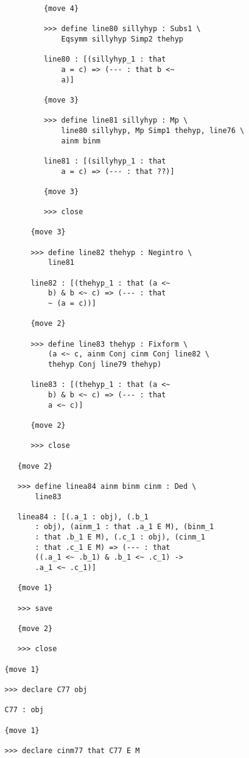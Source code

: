 \documentclass[12pt]{article}
\begin{document}
\begin{verbatim}
            {move 4}

            >>> define line80 sillyhyp : Subs1 \
                Eqsymm sillyhyp Simp2 thehyp

            line80 : [(sillyhyp_1 : that 
                a = c) => (--- : that b <~ 
                a)]

            {move 3}

            >>> define line81 sillyhyp : Mp \
                line80 sillyhyp, Mp Simp1 thehyp, line76 \
                ainm binm

            line81 : [(sillyhyp_1 : that 
                a = c) => (--- : that ??)]

            {move 3}

            >>> close

         {move 3}

         >>> define line82 thehyp : Negintro \
             line81

         line82 : [(thehyp_1 : that (a <~ 
             b) & b <~ c) => (--- : that 
             ~ (a = c))]

         {move 2}

         >>> define line83 thehyp : Fixform \
             (a <~ c, ainm Conj cinm Conj line82 \
             thehyp Conj line79 thehyp)

         line83 : [(thehyp_1 : that (a <~ 
             b) & b <~ c) => (--- : that 
             a <~ c)]

         {move 2}

         >>> close

      {move 2}

      >>> define linea84 ainm binm cinm : Ded \
          line83

      linea84 : [(.a_1 : obj), (.b_1 
          : obj), (ainm_1 : that .a_1 E M), (binm_1 
          : that .b_1 E M), (.c_1 : obj), (cinm_1 
          : that .c_1 E M) => (--- : that 
          ((.a_1 <~ .b_1) & .b_1 <~ .c_1) -> 
          .a_1 <~ .c_1)]

      {move 1}

      >>> save

      {move 2}

      >>> close

   {move 1}

   >>> declare C77 obj

   C77 : obj

   {move 1}

   >>> declare cinm77 that C77 E M


\end{verbatim}
\end{document}
